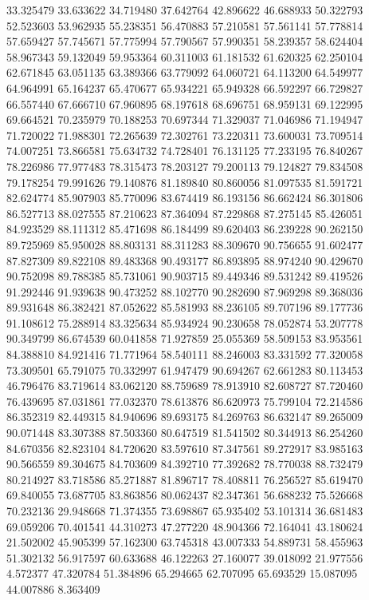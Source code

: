 33.325479
33.633622
34.719480
37.642764
42.896622
46.688933
50.322793
52.523603
53.962935
55.238351
56.470883
57.210581
57.561141
57.778814
57.659427
57.745671
57.775994
57.790567
57.990351
58.239357
58.624404
58.967343
59.132049
59.953364
60.311003
61.181532
61.620325
62.250104
62.671845
63.051135
63.389366
63.779092
64.060721
64.113200
64.549977
64.964991
65.164237
65.470677
65.934221
65.949328
66.592297
66.729827
66.557440
67.666710
67.960895
68.197618
68.696751
68.959131
69.122995
69.664521
70.235979
70.188253
70.697344
71.329037
71.046986
71.194947
71.720022
71.988301
72.265639
72.302761
73.220311
73.600031
73.709514
74.007251
73.866581
75.634732
74.728401
76.131125
77.233195
76.840267
78.226986
77.977483
78.315473
78.203127
79.200113
79.124827
79.834508
79.178254
79.991626
79.140876
81.189840
80.860056
81.097535
81.591721
82.624774
85.907903
85.770096
83.674419
86.193156
86.662424
86.301806
86.527713
88.027555
87.210623
87.364094
87.229868
87.275145
85.426051
84.923529
88.111312
85.471698
86.184499
89.620403
86.239228
90.262150
89.725969
85.950028
88.803131
88.311283
88.309670
90.756655
91.602477
87.827309
89.822108
89.483368
90.493177
86.893895
88.974240
90.429670
90.752098
89.788385
85.731061
90.903715
89.449346
89.531242
89.419526
91.292446
91.939638
90.473252
88.102770
90.282690
87.969298
89.368036
89.931648
86.382421
87.052622
85.581993
88.236105
89.707196
89.177736
91.108612
75.288914
83.325634
85.934924
90.230658
78.052874
53.207778
90.349799
86.674539
60.041858
71.927859
25.055369
58.509153
83.953561
84.388810
84.921416
71.771964
58.540111
88.246003
83.331592
77.320058
73.309501
65.791075
70.332997
61.947479
90.694267
62.661283
80.113453
46.796476
83.719614
83.062120
88.759689
78.913910
82.608727
87.720460
76.439695
87.031861
77.032370
78.613876
86.620973
75.799104
72.214586
86.352319
82.449315
84.940696
89.693175
84.269763
86.632147
89.265009
90.071448
83.307388
87.503360
80.647519
81.541502
80.344913
86.254260
84.670356
82.823104
84.720620
83.597610
87.347561
89.272917
83.985163
90.566559
89.304675
84.703609
84.392710
77.392682
78.770038
88.732479
80.214927
83.718586
85.271887
81.896717
78.408811
76.256527
85.619470
69.840055
73.687705
83.863856
80.062437
82.347361
56.688232
75.526668
70.232136
29.948668
71.374355
73.698867
65.935402
53.101314
36.681483
69.059206
70.401541
44.310273
47.277220
48.904366
72.164041
43.180624
21.502002
45.905399
57.162300
63.745318
43.007333
54.889731
58.455963
51.302132
56.917597
60.633688
46.122263
27.160077
39.018092
21.977556
4.572377
47.320784
51.384896
65.294665
62.707095
65.693529
15.087095
44.007886
8.363409
